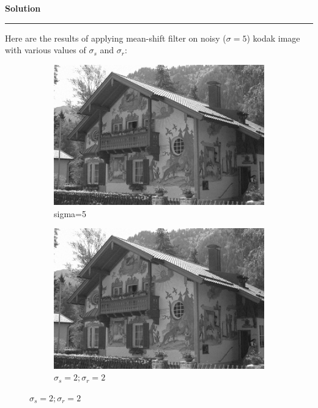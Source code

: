 \documentclass[a4paper,12pt]{article}
\newenvironment{solution}[2][]{%
    \begin{mdframed}[linecolor=green!60!black, linewidth=2pt, roundcorner=10pt, backgroundcolor=green!5!white, skipabove=12pt, skipbelow=12pt]%
        \textbf{\large #2} %
        \par\noindent\rule{\textwidth}{0.4pt} %
        \vspace{0.5em} %
}{%
    \end{mdframed}%
}
\begin{document}
\begin{solution}{Solution}
Here are the results of applying mean-shift filter on noisy ($\sigma = 5$) kodak image with various values of $\sigma_s$ and $\sigma_r$:

\begin{figure}[H]
    \centering
    \begin{subfigure}[b]{0.24\textwidth}
        \centering
        \includegraphics[width=\textwidth]{../images/noisy_kodak24.png}
        \caption{sigma=5}
        \label{Noisy }
    \end{subfigure}
    \begin{subfigure}[b]{0.24\textwidth}
        \centering
        \includegraphics[width=\textwidth]{../images/filtered_kodak24_meanshift_sigma_s_2_sigma_r_2.png}
        \caption{$\sigma_s=2;\sigma_r=2$}
        \label{fig:subfig2}
    \end{subfigure}

\end{figure}
\end{solution}
\end{document}
